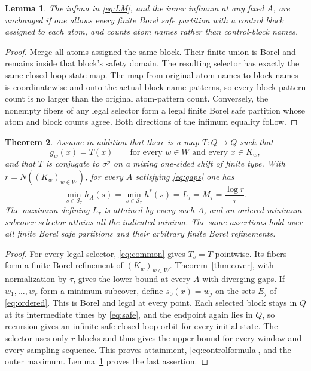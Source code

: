 \documentclass[11pt,reqno]{amsart}
\numberwithin{equation}{section}
\newtheorem{theorem}{Theorem}[section]
\newtheorem{lemma}[theorem]{Lemma}
\theoremstyle{definition}
\theoremstyle{remark}
\newcommand{\Ssafe}{\mathscr S}
\newcommand{\hpat}{h^{*}}
\begin{document}
\begin{lemma}\label{lem:merge}
The infima in \eqref{eq:LM}, and the inner infimum at any fixed $A$, are
unchanged if one allows every finite Borel safe partition with a
control block assigned to each atom, and counts atom names rather than
control-block names.
\end{lemma}
\begin{proof}
Merge all atoms assigned the same block. Their finite union is Borel
and remains inside that block's safety domain. The resulting selector
has exactly the same closed-loop state map. The map from original atom
names to block names is coordinatewise and onto the actual block-name
patterns, so every block-pattern count is no larger than the original
atom-pattern count. Conversely, the nonempty fibers of any legal
selector form a legal finite Borel safe partition whose atom and
block counts agree. Both directions of the infimum equality follow.
\end{proof}

\begin{theorem}\label{thm:control}
Assume in addition that there is a map $T:Q\to Q$ such that
\begin{equation}\label{eq:common}
 g_w(x)=T(x)\qquad\text{for every }w\in W\text{ and every }x\in K_w,
\end{equation}
and that $T$ is conjugate to $\sigma^p$ on a mixing one-sided shift of
finite type. With $r=N((K_w)_{w\in W})$, for every $A$ satisfying
\eqref{eq:gaps} one has
\begin{equation}\label{eq:controlformula}
 \min_{s\in\Ssafe_\tau}h_A(s)
 =\min_{s\in\Ssafe_\tau}\hpat(s)
 =L_\tau=M_\tau=\frac{\log r}{\tau}.
\end{equation}
The maximum defining $L_\tau$ is attained by every such $A$, and an
ordered minimum-subcover selector attains all the indicated minima.
The same assertions hold over all finite Borel safe partitions and
their arbitrary finite Borel refinements.
\end{theorem}
\begin{proof}
For every legal selector, \eqref{eq:common} gives $T_s=T$ pointwise.
Its fibers form a finite Borel refinement of $(K_w)_{w\in W}$.
Theorem~\ref{thm:cover}, with normalization by $\tau$, gives the lower
bound at every $A$ with diverging gaps. If $w_1,\ldots,w_r$ form a
minimum subcover, define $s_0(x)=w_j$ on the sets $E_j$ of
\eqref{eq:ordered}. This is Borel and legal at every point. Each selected
block stays in $Q$ at its intermediate times by \eqref{eq:safe}, and
the endpoint again lies in $Q$, so recursion gives an infinite safe
closed-loop orbit for every initial state. The selector uses only $r$
blocks and thus gives the upper bound for every window and every
sampling sequence. This proves attainment, \eqref{eq:controlformula},
and the outer maximum. Lemma~\ref{lem:merge} proves the last assertion.
\end{proof}
\end{document}
